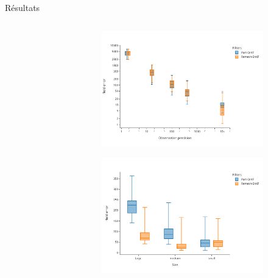 \documentclass[aspectratio=169]{beamer} %
\begin{document}
\begin{frame}{Résultats}
\begin{columns}[t]
\begin{column}{0.5\textwidth}
\begin{figure}
\begin{subfigure}{\textwidth}
                \end{subfigure}
            \end{figure}
        \end{column}
        \begin{column}{0.5\textwidth}
            \begin{figure}
                \begin{subfigure}{\textwidth}
                    \centering
                    \includegraphics[height=0.40\textheight]{../../conference/images/dipole_results/MSE_obs_precision_box_log.pdf}
                \end{subfigure}
                \begin{subfigure}{\textwidth}
                    \centering
                    \includegraphics[height=0.40\textheight]{../../conference/images/dipole_results/MSE_size_box.pdf}
                \end{subfigure}
            \end{figure}
        \end{column}
    \end{columns}
\end{frame}
\end{document}
